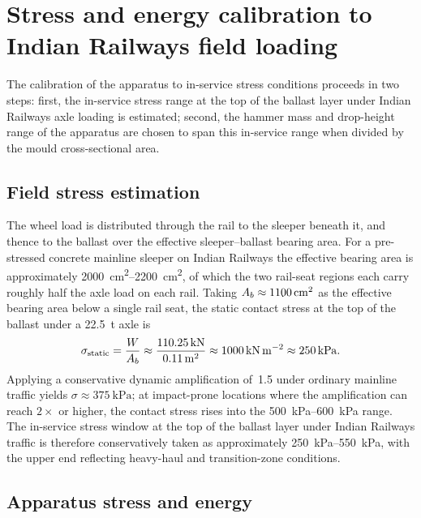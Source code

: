 \section{Stress and energy calibration to Indian Railways field loading}
\label{sec:meth-calibration}

The calibration of the apparatus to in-service stress conditions proceeds
in two steps: first, the in-service stress range at the top of the ballast
layer under Indian Railways axle loading is estimated; second, the hammer
mass and drop-height range of the apparatus are chosen to span this
in-service range when divided by the mould cross-sectional area.

\subsection{Field stress estimation}
\label{sec:meth-field-stress}

The wheel load is distributed through the rail to the sleeper beneath it,
and thence to the ballast over the effective sleeper--ballast bearing area.
For a pre-stressed concrete mainline sleeper on Indian Railways the
effective bearing area is approximately
\SIrange{2000}{2200}{\centi\metre\squared}, of which the two rail-seat
regions each carry roughly half the axle load on each rail. Taking $A_{b}
\approx \SI{1100}{\centi\metre\squared}$ as the effective bearing area
below a single rail seat, the static contact stress at the top of the
ballast under a \SI{22.5}{\tonne} axle is
\begin{equation}
    \sigma_{\text{static}} = \frac{W}{A_{b}}
    \approx \frac{\SI{110.25}{\kilo\newton}}{\SI{0.11}{\metre\squared}}
    \approx \SI{1000}{\kilo\newton\per\metre\squared}
    \approx \SI{250}{\kilo\pascal}.
    \label{eq:meth-sigma-static}
\end{equation}
Applying a conservative dynamic amplification of~1.5 under ordinary
mainline traffic yields $\sigma \approx \SI{375}{\kilo\pascal}$; at
impact-prone locations where the amplification can reach $2\times$ or
higher, the contact stress rises into the
\SIrange{500}{600}{\kilo\pascal} range. The in-service stress window at the
top of the ballast layer under Indian Railways traffic is therefore
conservatively taken as approximately \SIrange{250}{550}{\kilo\pascal},
with the upper end reflecting heavy-haul and transition-zone conditions.

\subsection{Apparatus stress and energy}
\label{sec:meth-apparatus-stress}


